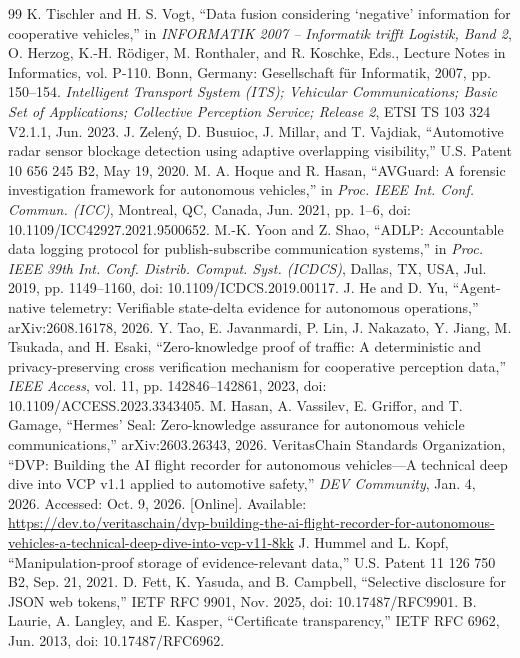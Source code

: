 \begin{thebibliography}{99}
 K. Tischler and H. S. Vogt, ``Data fusion considering `negative' information for cooperative vehicles,'' in \emph{INFORMATIK 2007 -- Informatik trifft Logistik, Band 2}, O. Herzog, K.-H. R\"{o}diger, M. Ronthaler, and R. Koschke, Eds., Lecture Notes in Informatics, vol. P-110. Bonn, Germany: Gesellschaft f\"{u}r Informatik, 2007, pp. 150--154.
 \emph{Intelligent Transport System (ITS); Vehicular Communications; Basic Set of Applications; Collective Perception Service; Release 2}, ETSI TS 103 324 V2.1.1, Jun. 2023.
 J. Zelen\'{y}, D. Busuioc, J. Millar, and T. Vajdiak, ``Automotive radar sensor blockage detection using adaptive overlapping visibility,'' U.S. Patent 10 656 245 B2, May 19, 2020.
 M. A. Hoque and R. Hasan, ``AVGuard: A forensic investigation framework for autonomous vehicles,'' in \emph{Proc. IEEE Int. Conf. Commun. (ICC)}, Montreal, QC, Canada, Jun. 2021, pp. 1--6, doi: 10.1109/ICC42927.2021.9500652.
 M.-K. Yoon and Z. Shao, ``ADLP: Accountable data logging protocol for publish-subscribe communication systems,'' in \emph{Proc. IEEE 39th Int. Conf. Distrib. Comput. Syst. (ICDCS)}, Dallas, TX, USA, Jul. 2019, pp. 1149--1160, doi: 10.1109/ICDCS.2019.00117.
 J. He and D. Yu, ``Agent-native telemetry: Verifiable state-delta evidence for autonomous operations,'' arXiv:2608.16178, 2026.
 Y. Tao, E. Javanmardi, P. Lin, J. Nakazato, Y. Jiang, M. Tsukada, and H. Esaki, ``Zero-knowledge proof of traffic: A deterministic and privacy-preserving cross verification mechanism for cooperative perception data,'' \emph{IEEE Access}, vol. 11, pp. 142846--142861, 2023, doi: 10.1109/ACCESS.2023.3343405.
 M. Hasan, A. Vassilev, E. Griffor, and T. Gamage, ``Hermes' Seal: Zero-knowledge assurance for autonomous vehicle communications,'' arXiv:2603.26343, 2026.
 VeritasChain Standards Organization, ``DVP: Building the AI flight recorder for autonomous vehicles---A technical deep dive into VCP v1.1 applied to automotive safety,'' \emph{DEV Community}, Jan. 4, 2026. Accessed: Oct. 9, 2026. [Online]. Available: \url{https://dev.to/veritaschain/dvp-building-the-ai-flight-recorder-for-autonomous-vehicles-a-technical-deep-dive-into-vcp-v11-8kk}
 J. Hummel and L. Kopf, ``Manipulation-proof storage of evidence-relevant data,'' U.S. Patent 11 126 750 B2, Sep. 21, 2021.
 D. Fett, K. Yasuda, and B. Campbell, ``Selective disclosure for JSON web tokens,'' IETF RFC 9901, Nov. 2025, doi: 10.17487/RFC9901.
 B. Laurie, A. Langley, and E. Kasper, ``Certificate transparency,'' IETF RFC 6962, Jun. 2013, doi: 10.17487/RFC6962.

\end{thebibliography}
